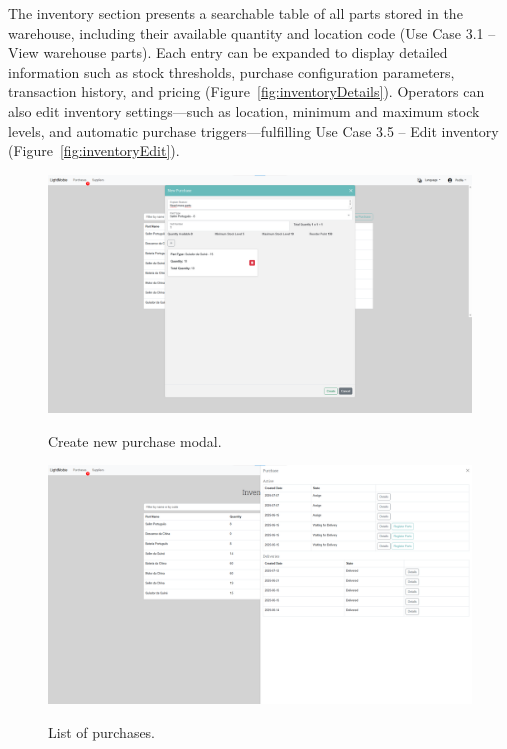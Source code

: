 The inventory section presents a searchable table of all parts stored in the warehouse, including their available quantity and location code (Use Case 3.1 – View warehouse parts). Each entry can be expanded to display detailed information such as stock thresholds, purchase configuration parameters, transaction history, and pricing (Figure~\ref{fig:inventoryDetails}). Operators can also edit inventory settings—such as location, minimum and maximum stock levels, and automatic purchase triggers—fulfilling Use Case 3.5 – Edit inventory (Figure~\ref{fig:inventoryEdit}).


\begin{figure}[h]
  \caption{Create new purchase modal.}
  \centering
  \includegraphics[width=\textwidth]{figs/Implementation/warehouse/createPurchase}
  \label{fig:createPurchase}
\end{figure}


\begin{figure}[h]
  \caption{List of purchases.}
  \centering
  \includegraphics[width=\textwidth]{figs/Implementation/warehouse/PurchaseList}
  \label{fig:PurchaseList}
\end{figure}






